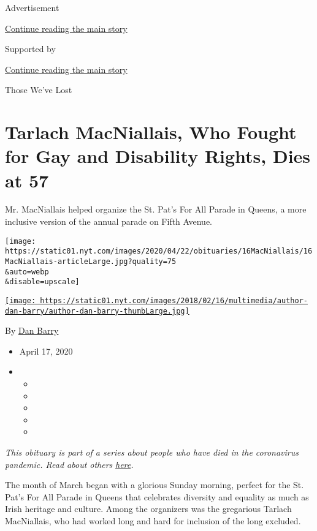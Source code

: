 Advertisement

\protect\hyperlink{after-top}{Continue reading the main story}

Supported by

\protect\hyperlink{after-sponsor}{Continue reading the main story}

Those We've Lost

\hypertarget{tarlach-macniallais-who-fought-for-gay-and-disability-rights-dies-at-57}{%
\section{Tarlach MacNiallais, Who Fought for Gay and Disability Rights,
Dies at
57}\label{tarlach-macniallais-who-fought-for-gay-and-disability-rights-dies-at-57}}

Mr. MacNiallais helped organize the St. Pat's For All Parade in Queens,
a more inclusive version of the annual parade on Fifth Avenue.

\texttt{[image: https://static01.nyt.com/images/2020/04/22/obituaries/16MacNiallais/16MacNiallais-articleLarge.jpg?quality=75\\\&auto=webp\\\&disable=upscale]}

\href{https://www.nytimes.com/by/dan-barry}{\texttt{[image: https://static01.nyt.com/images/2018/02/16/multimedia/author-dan-barry/author-dan-barry-thumbLarge.jpg]}}

By \href{https://www.nytimes.com/by/dan-barry}{Dan Barry}

\begin{itemize}
\item
  April 17, 2020
\item
  \begin{itemize}
  \item
  \item
  \item
  \item
  \item
  \end{itemize}
\end{itemize}

\emph{This obituary is part of a series about people who have died in
the coronavirus pandemic. Read about others}
\href{https://www.nytimes.com/series/people-who-have-died-of-the-coronavirus}{\emph{here}}\emph{.}

The month of March began with a glorious Sunday morning, perfect for the
St. Pat's For All Parade in Queens that celebrates diversity and
equality as much as Irish heritage and culture. Among the organizers was
the gregarious Tarlach MacNiallais, who had worked long and hard for
inclusion of the long excluded.

